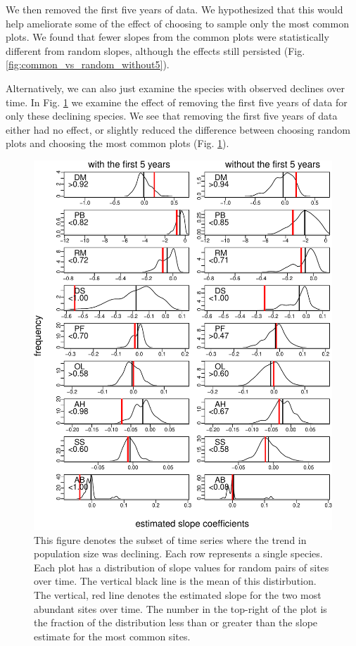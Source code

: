 \documentclass[]{article}
\begin{document}
We then removed the first five years of data. We hypothesized that this
would help ameliorate some of the effect of choosing to sample only the
most common plots. We found that fewer slopes from the common plots were
statistically different from random slopes, although the effects still
persisted (Fig. \ref{fig:common_vs_random_without5}).

Alternatively, we can also just examine the species with observed
declines over time. In Fig. \ref{fig:declining_species} we examine the
effect of removing the first five years of data for only these declining
species. We see that removing the first five years of data either had no
effect, or slightly reduced the difference between choosing random plots
and choosing the most common plots (Fig. \ref{fig:declining_species}).

\begin{figure}
\centering
\includegraphics{Empirical_Investigation_files/figure-latex/unnamed-chunk-4-1.pdf}
\caption{This figure denotes the subset of time series where the trend
in population size was declining. Each row represents a single species.
Each plot has a distribution of slope values for random pairs of sites
over time. The vertical black line is the mean of this distirbution. The
vertical, red line denotes the estimated slope for the two most abundant
sites over time. The number in the top-right of the plot is the fraction
of the distribution less than or greater than the slope estimate for the
most common sites.\label{fig:declining_species}}
\end{figure}
\end{document}
